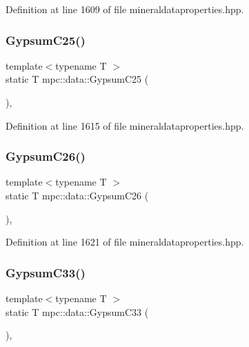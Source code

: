 Definition at line 1609 of file mineraldataproperties.\+hpp.

\mbox{\label{namespacempc_1_1data_a3dcfa64b5cccabe95b711fe6c8e1c7c6}} 
\subsubsection{\texorpdfstring{Gypsum\+C25()}{GypsumC25()}}
{\footnotesize\ttfamily template$<$typename T $>$ \\
static T mpc\+::data\+::\+Gypsum\+C25 (\begin{DoxyParamCaption}{ }\end{DoxyParamCaption})\hspace{0.3cm}{\ttfamily [inline]}, {\ttfamily [static]}}



Definition at line 1615 of file mineraldataproperties.\+hpp.

\mbox{\label{namespacempc_1_1data_a8e907e810207c4d7475ecf96cd487828}} 
\subsubsection{\texorpdfstring{Gypsum\+C26()}{GypsumC26()}}
{\footnotesize\ttfamily template$<$typename T $>$ \\
static T mpc\+::data\+::\+Gypsum\+C26 (\begin{DoxyParamCaption}{ }\end{DoxyParamCaption})\hspace{0.3cm}{\ttfamily [inline]}, {\ttfamily [static]}}



Definition at line 1621 of file mineraldataproperties.\+hpp.

\mbox{\label{namespacempc_1_1data_acb91c2cea9724bf28fe6708fca9dde78}} 
\subsubsection{\texorpdfstring{Gypsum\+C33()}{GypsumC33()}}
{\footnotesize\ttfamily template$<$typename T $>$ \\
static T mpc\+::data\+::\+Gypsum\+C33 (\begin{DoxyParamCaption}{ }\end{DoxyParamCaption})\hspace{0.3cm}{\ttfamily [inline]}, {\ttfamily [static]}}



